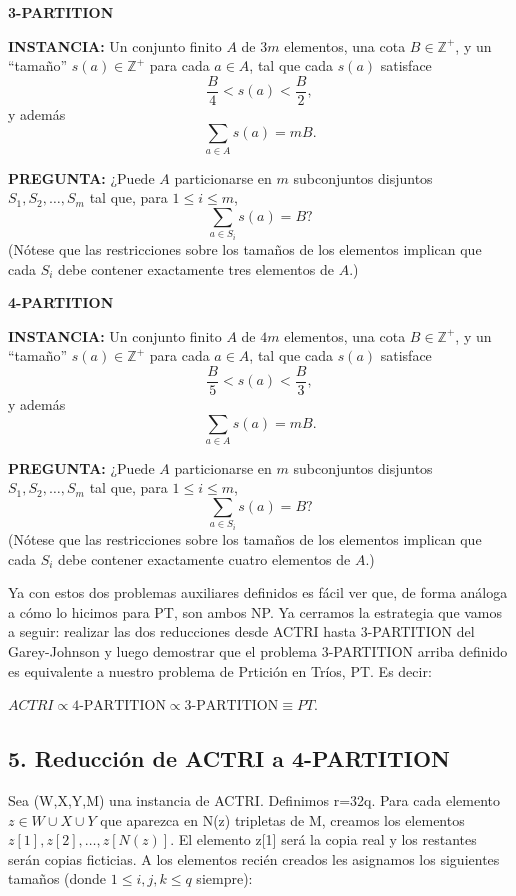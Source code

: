 \documentclass{article}
\begin{document}
\vspace{1\baselineskip}
\textbf{3-PARTITION}

\textbf{INSTANCIA:} Un conjunto finito $A$ de $3m$ elementos, una cota $B \in \mathbb{Z}^+$, y un ``tamaño'' $s(a) \in \mathbb{Z}^+$ para cada $a \in A$, tal que cada $s(a)$ satisface
\[
\frac{B}{4} < s(a) < \frac{B}{2},
\]
y además
\[
\sum_{a \in A} s(a) = mB.
\]

\textbf{PREGUNTA:} ¿Puede $A$ particionarse en $m$ subconjuntos disjuntos $S_1, S_2, \ldots, S_m$ tal que, para $1 \le i \le m$,
\[
\sum_{a \in S_i} s(a) = B?
\]
(Nótese que las restricciones sobre los tamaños de los elementos implican que cada $S_i$ debe contener exactamente tres elementos de $A$.)

\vspace{1\baselineskip}
\textbf{4-PARTITION}

\textbf{INSTANCIA:} Un conjunto finito $A$ de $4m$ elementos, una cota $B \in \mathbb{Z}^+$, y un ``tamaño'' $s(a) \in \mathbb{Z}^+$ para cada $a \in A$, tal que cada $s(a)$ satisface
\[
\frac{B}{5} < s(a) < \frac{B}{3},
\]
y además
\[
\sum_{a \in A} s(a) = mB.
\]

\textbf{PREGUNTA:} ¿Puede $A$ particionarse en $m$ subconjuntos disjuntos $S_1, S_2, \ldots, S_m$ tal que, para $1 \le i \le m$,
\[
\sum_{a \in S_i} s(a) = B?
\]
(Nótese que las restricciones sobre los tamaños de los elementos implican que cada $S_i$ debe contener exactamente cuatro elementos de $A$.)

\vspace{1\baselineskip}
Ya con estos dos problemas auxiliares definidos es fácil ver que, de forma análoga a cómo lo hicimos para PT, son ambos NP. Ya cerramos la estrategia que vamos a seguir: realizar las dos reducciones desde ACTRI hasta 3-PARTITION del Garey-Johnson y luego demostrar que el problema 3-PARTITION arriba definido es equivalente a nuestro problema de Prtición en Tríos, PT. Es decir:

$ACTRI
\propto
4\text{-PARTITION}
\propto
3\text{-PARTITION}
\equiv
PT.$

\subsection*{5. Reducción de ACTRI a 4-PARTITION}

Sea (W,X,Y,M) una instancia de ACTRI. Definimos r=32q. Para cada elemento $z\in W\cup X\cup Y$ que aparezca en N(z) tripletas de M, creamos los elementos $z[1],z[2],\ldots,z[N(z)]$. El elemento z[1] será la copia real y los restantes serán copias ficticias. A los elementos recién creados les asignamos los siguientes tamaños (donde $1 \le i, j, k \le q$ siempre):
\end{document}
